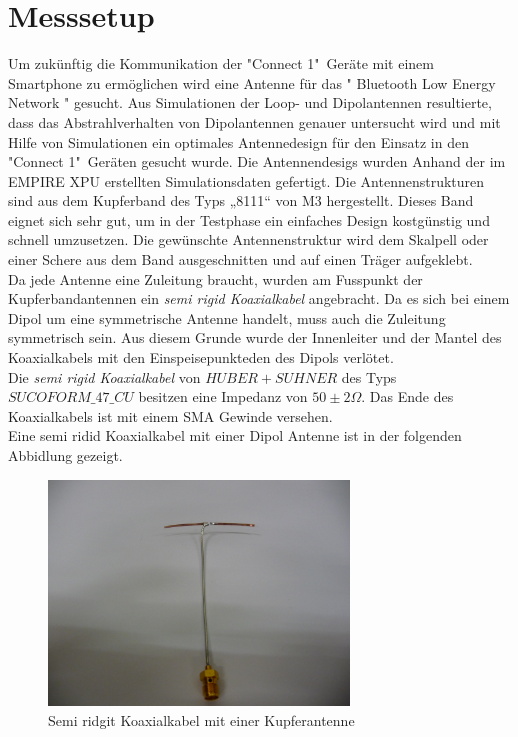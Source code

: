 \section{Messsetup}
Um zukünftig die Kommunikation der "Connect 1"\   Geräte mit einem Smartphone zu ermöglichen wird eine Antenne für das " Bluetooth Low Energy Network " gesucht. Aus Simulationen der Loop- und Dipolantennen resultierte, dass das Abstrahlverhalten von Dipolantennen genauer untersucht wird und mit Hilfe von Simulationen ein optimales Antennedesign für den Einsatz in den "Connect 1"\  Geräten gesucht wurde. 
Die Antennendesigs wurden Anhand der im EMPIRE XPU erstellten Simulationsdaten gefertigt. Die Antennenstrukturen sind aus dem Kupferband des Typs „8111“ von M3 hergestellt. Dieses Band eignet sich sehr gut, um in der Testphase ein einfaches Design kostgünstig und schnell umzusetzen. Die gewünschte Antennenstruktur wird dem Skalpell oder einer Schere aus dem Band ausgeschnitten und auf einen Träger aufgeklebt. \\
Da jede Antenne eine Zuleitung braucht, wurden am Fusspunkt der Kupferbandantennen ein \textit{semi rigid Koaxialkabel} angebracht. Da es sich bei einem Dipol um eine symmetrische Antenne handelt, muss auch die Zuleitung symmetrisch sein. Aus diesem Grunde wurde der Innenleiter und der Mantel des Koaxialkabels mit den Einspeisepunkteden des Dipols verlötet.\\
Die \textit{semi rigid Koaxialkabel} von $HUBER+SUHNER$ des Typs $SUCOFORM\_47\_CU$ besitzen eine Impedanz von $50  \pm 2\Omega$. Das Ende des Koaxialkabels ist mit einem SMA Gewinde versehen.\\

Eine semi ridid Koaxialkabel mit einer Dipol Antenne ist in der folgenden Abbidlung gezeigt.
\begin{figure}[!h]
	\centering
	\includegraphics[width=8cm]{content/bilder/Implementierung/KoaxMitAntenne.JPG}%
	\caption{Semi ridgit Koaxialkabel mit einer Kupferantenne}
	\label{fig:KoaxMitAntenne}
\end{figure}

